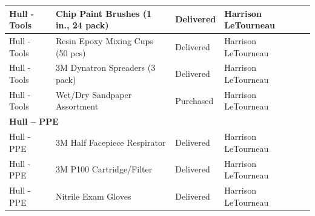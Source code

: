 \begin{table}[htbp]
\begin{tabular}{|p{2.2cm}|p{5.5cm}|p{2.2cm}|p{2.5cm}|p{3.5cm}|}
\hline
Hull - Tools & Chip Paint Brushes (1 in., 24 pack) & Delivered & Harrison LeTourneau & \\
\hline
Hull - Tools & Resin Epoxy Mixing Cups (50 pcs) & Delivered & Harrison LeTourneau & \\
\hline
Hull - Tools & 3M Dynatron Spreaders (3 pack) & Delivered & Harrison LeTourneau & \\
\hline
Hull - Tools & Wet/Dry Sandpaper Assortment & Purchased & Harrison LeTourneau & \\
\hline
\multicolumn{5}{|l|}{\textbf{Hull -- PPE}} \\
\hline
Hull - PPE & 3M Half Facepiece Respirator & Delivered & Harrison LeTourneau & \\
\hline
Hull - PPE & 3M P100 Cartridge/Filter & Delivered & Harrison LeTourneau & \\
\hline
Hull - PPE & Nitrile Exam Gloves & Delivered & Harrison LeTourneau & \\
\hline
\end{tabular}
\end{table}

